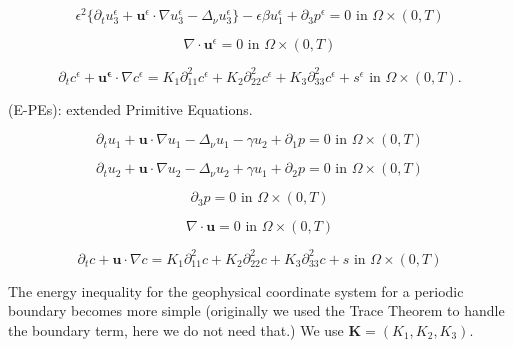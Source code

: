 \documentclass[11pt]{article}
\begin{document}
    \begin{equation} \label{ANSC3}
    \epsilon^2 \{  \partial_t u_3^\epsilon + \mathbf{u}^\epsilon \cdot \nabla u_3^\epsilon -\Delta_\nu u_3^{\epsilon} \} - \epsilon \beta u_1^\epsilon + \partial_3 p^\epsilon = 0 \text{ in } \Omega \times (0,T)
    \end{equation}
    
    \begin{equation} \label{ANSC4}
    \nabla \cdot \mathbf{u}^\epsilon= 0 \text{ in } \Omega \times (0,T)
    \end{equation}
    
    \begin{equation} \label{ANSC5}
    \partial_t c^\epsilon + \mathbf{u^\epsilon} \cdot \nabla c^\epsilon = K_1 \partial_{11} ^ 2 c^\epsilon + K_2 \partial_{22} ^ 2 c^\epsilon + K_3 \partial_{33} ^ 2 c^\epsilon + s^\epsilon \text{ in } \Omega \times (0,T).
    \end{equation}

(E-PEs): extended Primitive Equations.

    \begin{equation} \label{HNSC1}    
    \partial_t u_1 + \mathbf{u} \cdot \nabla u_1 - \Delta_\nu u_1 - \gamma u_2 + \partial_1 p = 0 \text{ in } \Omega \times (0,T)
    \end{equation}
    
    \begin{equation} \label{HNSC2}   
    \partial_t u_2 + \mathbf{u} \cdot \nabla u_2 - \Delta_\nu u_2 + \gamma u_1 + \partial_2 p = 0 \text{ in } \Omega \times (0,T)
    \end{equation}
    
    \begin{equation} \label{HNSC3}   
    \partial_3 p = 0 \text{ in } \Omega \times (0,T)
    \end{equation}
    
    \begin{equation} \label{HNSC4}   
    \nabla \cdot \mathbf{u} = 0 \text{ in } \Omega \times (0,T)
    \end{equation}
    
    \begin{equation} \label{HNSC5}   
    \partial_t c + \mathbf{u} \cdot \nabla c = K_1 \partial_{11} ^ 2 c + K_2 \partial_{22} ^ 2 c + K_3 \partial_{33} ^2 c + s \text{ in } \Omega \times (0,T)
    \end{equation}

The energy inequality for the geophysical coordinate system for a periodic boundary becomes more simple (originally we used the Trace Theorem to handle the boundary term, here we do not need that.) We use $\mathbf{K} = (K_1, K_2, K_3).$
\end{document}
